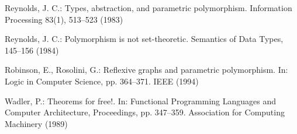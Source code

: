 \documentclass[runningheads]{llncs}
\begin{document}
\begin{thebibliography}{8}
 Reynolds, J. C.: Types, abstraction, and parametric
  polymorphism.  Information Processing 83(1), 513--523 (1983)

 Reynolds, J. C.: Polymorphism is not set-theoretic.
  Semantics of Data Types, 145--156 (1984)

 Robinson, E., Rosolini, G.: Reflexive graphs and
  parametric polymorphism.  In: Logic in Computer Science,
  pp. 364--371. IEEE (1994)

 Wadler, P.: Theorems for free!.  In: Functional
  Programming Languages and Computer Architecture, Proceedings,
  pp. 347--359. Association for Computing Machinery (1989)

\end{thebibliography}





    
\end{document}
